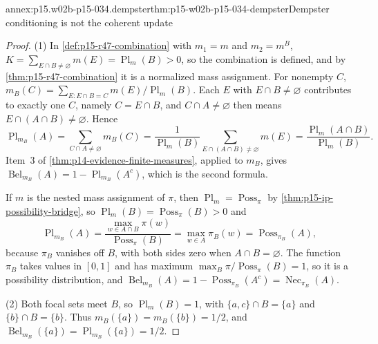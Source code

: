 \begin{annexitem}{annex:p15.w02b-p15-034.dempster}{thm:p15-w02b-p15-034-dempster}{Dempster conditioning is not the coherent update}
\begin{proof}
(1) In \cref{def:p15-r47-combination} with \(m_1=m\) and \(m_2=m^B\),
\(K=\sum_{E\cap B\ne\varnothing}m(E)=\operatorname{Pl}_m(B)>0\), so the
combination is defined, and by \cref{thm:p15-r47-combination} it is a
normalized mass assignment. For nonempty \(C\),
\(m_B(C)=\sum_{E:E\cap B=C}m(E)/\operatorname{Pl}_m(B)\). Each \(E\) with
\(E\cap B\ne\varnothing\) contributes to exactly one \(C\), namely
\(C=E\cap B\), and \(C\cap A\ne\varnothing\) then means
\(E\cap(A\cap B)\ne\varnothing\). Hence
\[
 \operatorname{Pl}_{m_B}(A)=\sum_{C\cap A\ne\varnothing}m_B(C)
 =\frac{1}{\operatorname{Pl}_m(B)}\sum_{E\cap(A\cap B)\ne\varnothing}m(E)
 =\frac{\operatorname{Pl}_m(A\cap B)}{\operatorname{Pl}_m(B)} .
\]
Item~3 of \cref{thm:p14-evidence-finite-measures}, applied to \(m_B\),
gives \(\operatorname{Bel}_{m_B}(A)=1-\operatorname{Pl}_{m_B}(A^c)\),
which is the second formula.

If \(m\) is the nested mass assignment of \(\pi\), then
\(\operatorname{Pl}_m=\operatorname{Poss}_\pi\) by
\cref{thm:p15-ip-possibility-bridge}, so
\(\operatorname{Pl}_m(B)=\operatorname{Poss}_\pi(B)>0\) and
\[
 \operatorname{Pl}_{m_B}(A)=\frac{\max_{w\in A\cap B}\pi(w)}{\operatorname{Poss}_\pi(B)}
 =\max_{w\in A}\pi_B(w)=\operatorname{Poss}_{\pi_B}(A),
\]
because \(\pi_B\) vanishes off \(B\), with both sides zero when
\(A\cap B=\varnothing\). The function \(\pi_B\) takes values in
\([0,1]\) and has maximum \(\max_B\pi/\operatorname{Poss}_\pi(B)=1\), so it
is a possibility distribution, and
\(\operatorname{Bel}_{m_B}(A)=1-\operatorname{Poss}_{\pi_B}(A^c)
=\operatorname{Nec}_{\pi_B}(A)\).

(2) Both focal sets meet \(B\), so \(\operatorname{Pl}_m(B)=1\), with
\(\{a,c\}\cap B=\{a\}\) and \(\{b\}\cap B=\{b\}\). Thus
\(m_B(\{a\})=m_B(\{b\})=1/2\), and
\(\operatorname{Bel}_{m_B}(\{a\})=\operatorname{Pl}_{m_B}(\{a\})=1/2\).


\end{proof}
\end{annexitem}
